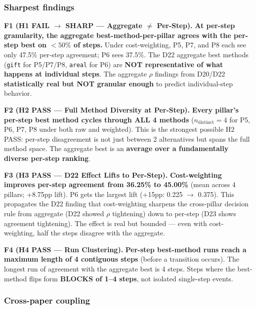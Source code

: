 \documentclass{article}
\begin{document}
\subsubsection{Sharpest findings}\label{sec:synth-d23-findings}

\textbf{F1 (H1 FAIL $\rightarrow$ SHARP --- Aggregate $\neq$ Per-Step).}
\textbf{At per-step granularity, the aggregate best-method-per-pillar
agrees with the per-step best on $< 50\%$ of steps.} Under cost-weighting,
P5, P7, and P8 each see only 47.5\% per-step agreement; P6 sees 37.5\%.
The D22 aggregate best methods (\texttt{gift} for P5/P7/P8, \texttt{areal}
for P6) are \textbf{NOT representative of what happens at individual steps}.
The aggregate $\rho$ findings from D20/D22 \textbf{statistically real but
NOT granular enough} to predict individual-step behavior.

\textbf{F2 (H2 PASS --- Full Method Diversity at Per-Step).}
\textbf{Every pillar's per-step best method cycles through ALL 4 methods}
($n_{\mathrm{distinct}}=4$ for P5, P6, P7, P8 under both raw and weighted).
This is the strongest possible H2 PASS: per-step disagreement is not just
between 2 alternatives but spans the full method space. The aggregate best
is an \textbf{average over a fundamentally diverse per-step ranking}.

\textbf{F3 (H3 PASS --- D22 Effect Lifts to Per-Step).}
\textbf{Cost-weighting improves per-step agreement from 36.25\% to 45.00\%}
(mean across 4 pillars; +8.75pp lift). P6 gets the largest lift (+15pp:
0.225 $\to$ 0.375). This propagates the D22 finding that cost-weighting
sharpens the cross-pillar decision rule from aggregate (D22 showed $\rho$
tightening) down to per-step (D23 shows agreement tightening). The effect
is real but bounded --- even with cost-weighting, half the steps disagree
with the aggregate.

\textbf{F4 (H4 PASS --- Run Clustering).}
\textbf{Per-step best-method runs reach a maximum length of 4 contiguous
steps} (before a transition occurs). The longest run of agreement with
the aggregate best is 4 steps. Steps where the best-method flips form
\textbf{BLOCKS of 1--4 steps}, not isolated single-step events.

\subsubsection{Cross-paper coupling}\label{sec:synth-d23-coupling}
\end{document}
